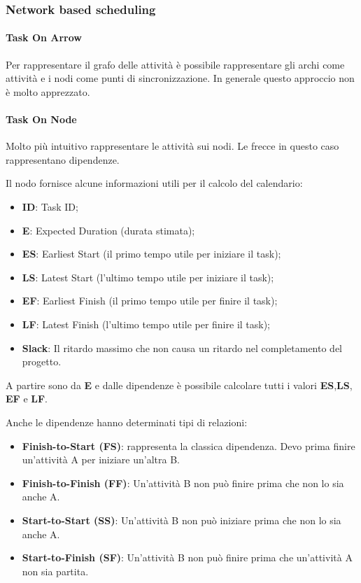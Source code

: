 \subsubsection{Network based scheduling}
\paragraph{Task On Arrow}
Per rappresentare il grafo delle attività è possibile rappresentare gli archi come attività e i nodi come punti di sincronizzazione. In generale questo approccio non è molto apprezzato.
\paragraph{Task On Node}
Molto più intuitivo rappresentare le attività sui nodi. Le frecce in questo caso rappresentano dipendenze.

\noindent Il nodo fornisce alcune informazioni utili per il calcolo del calendario:
\begin{itemize}
	\item \textbf{ID}: Task ID;
	\item \textbf{E}: Expected Duration (durata stimata);
	\item \textbf{ES}: Earliest Start (il primo tempo utile per iniziare il task);
	\item \textbf{LS}: Latest Start (l'ultimo tempo utile per iniziare il task);
	\item \textbf{EF}: Earliest Finish (il primo tempo utile per finire il task);
	\item \textbf{LF}: Latest Finish (l'ultimo tempo utile per finire il task);
	\item \textbf{Slack}: Il ritardo massimo che non causa un ritardo nel completamento del progetto.
\end{itemize}
A partire sono da \textbf{E} e dalle dipendenze è possibile calcolare tutti i valori \textbf{ES},\textbf{LS}, \textbf{EF} e \textbf{LF}.

\noindent Anche le dipendenze hanno determinati tipi di relazioni:
\begin{itemize}
	\item \textbf{Finish-to-Start (FS)}: rappresenta la classica dipendenza. Devo prima finire un'attività A per iniziare un'altra B.
	\item \textbf{Finish-to-Finish (FF)}: Un'attività B non può finire prima che non lo sia anche A.
	\item \textbf{Start-to-Start (SS)}: Un'attività B non può iniziare prima che non lo sia anche A.
	\item \textbf{Start-to-Finish (SF)}: Un'attività B non può finire prima che un'attività A non sia partita.
\end{itemize}

